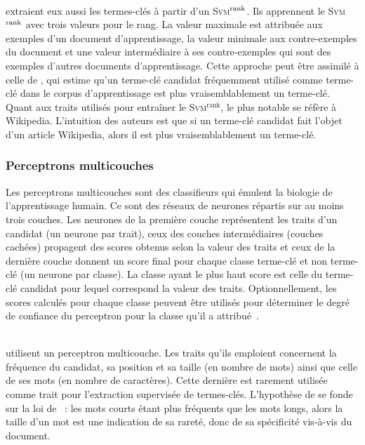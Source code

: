         ~\\ extraient eux aussi les termes-clés à
        partir d'un \textsc{Svm}$^\textnormal{rank}$. Ils apprennent le
        \textsc{Svm}$^\textnormal{rank}$ avec trois valeurs pour le rang. La
        valeur maximale est attribuée aux exemples d'un document
        d'apprentissage, la valeur minimale aux contre-exemples du document et
        une valeur intermédiaire à ses contre-exemples qui sont des exemples
        d'autres documents d'apprentissage. Cette approche peut être assimilé à
        celle de , qui estime qu'un terme-clé
        candidat fréquemment utilisé comme terme-clé dans le corpus
        d'apprentissage est plus vraisemblablement un terme-clé. Quant aux
        traits utilisés pour entraîner le \textsc{Svm}$^\text{rank}$, le plus
        notable se réfère à Wikipedia. L'intuition des auteurs est que si un
        terme-clé candidat fait l'objet d'un article Wikipedia, alors il est
        plus vraisemblablement un terme-clé.

      \subsubsection{Perceptrons multicouches}
      \label{subsubsec:main-state_of_the_art-automatic_keyphrase_extraction-supervised_keyphrase_extraction-neural_network}
        Les perceptrons multicouches sont des classifieurs qui émulent la
        biologie de l'apprentissage humain. Ce sont des réseaux de neurones
        répartis sur au moins trois couches. Les neurones de la première couche
        représentent les traits d'un candidat (un neurone par trait), ceux des
        couches intermédiaires (couches cachées) propagent des scores obtenus
        selon la valeur des traits et ceux de la dernière couche donnent un
        score final pour chaque classe \og{}terme-clé\fg{} et \og{}non
        terme-clé\fg{} (un neurone par classe). La classe ayant le plus haut
        score est celle du terme-clé candidat pour lequel correspond la valeur
        des traits. Optionnellement, les scores calculés pour chaque classe
        peuvent être utilisés pour déterminer le degré de confiance du
        perceptron pour la classe qu'il a
        attribué~\cite{denker1991neuralnetprobability}.
        
        ~\\ utilisent un perceptron
        multicouche. Les traits qu'ils emploient concernent la fréquence du
        candidat, sa position et sa taille (en nombre de mots) ainsi que celle
        de ses mots (en nombre de caractères). Cette dernière est rarement
        utilisée comme trait pour l'extraction supervisée de termes-clés.
        L'hypothèse de  se fonde sur la loi de
        ~: les mots courts étant plus fréquents que les
        mots longs, alors la taille d'un mot est une indication de sa rareté,
        donc de sa spécificité vis-à-vis du document.
        
